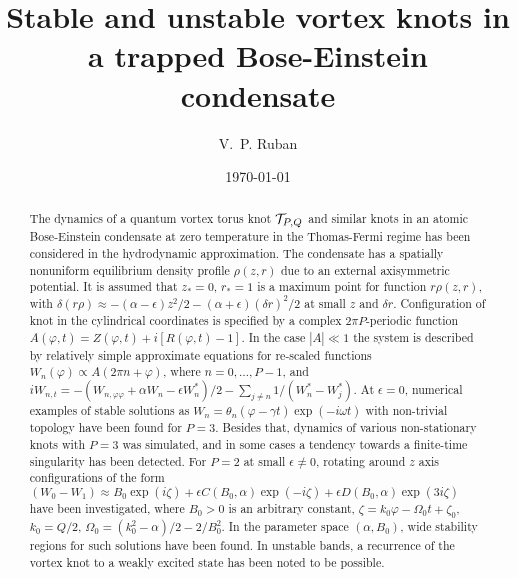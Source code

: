 \documentclass[pra,twocolumn,showpacs]{revtex4}
\begin{document}
\title{ Stable and unstable vortex knots in a trapped Bose-Einstein condensate }
\author{V.~P. Ruban}
\date{\today}

\begin{abstract}
The dynamics of a quantum vortex torus knot ${\cal T}_{P,Q}$ and similar knots in an atomic
Bose-Einstein condensate at zero temperature in the Thomas-Fermi regime has been considered 
in the hydrodynamic approximation. The condensate has a spatially nonuniform equilibrium 
density profile $\rho(z,r)$ due to an external axisymmetric potential. It is assumed that 
$z_*=0$, $r_*=1$ is a maximum point for function $r\rho(z,r)$, with 
$\delta (r\rho)\approx-(\alpha-\epsilon) z^2/2 -(\alpha+\epsilon) (\delta r)^2/2$ at small 
$z$ and $\delta r$. Configuration of knot in the cylindrical coordinates is specified by 
a complex $2\pi P$-periodic function $A(\varphi,t)=Z(\varphi,t)+i [R(\varphi,t)-1]$. 
In the case  $|A|\ll 1$ the system is described by relatively simple approximate equations
for re-scaled functions $W_n(\varphi)\propto A(2\pi n+\varphi)$, where $n=0,\dots,P-1$, and
$iW_{n,t}=-(W_{n,\varphi\varphi}+\alpha W_n -\epsilon W_n^*)/2-\sum_{j\neq n}1/(W_n^*-W_j^*)$.
At $\epsilon=0$, numerical examples of stable solutions as 
$W_n=\theta_n(\varphi-\gamma t)\exp(-i\omega t)$ with non-trivial topology have been found for $P=3$.
Besides that, dynamics of various non-stationary knots with $P=3$ was simulated, and in some
cases a tendency towards a finite-time singularity has been detected. For $P=2$ at small 
$\epsilon\neq 0$, rotating around $z$ axis configurations of the form
$(W_0-W_1)\approx B_0\exp(i\zeta)+\epsilon C(B_0,\alpha)\exp(-i\zeta) + \epsilon D(B_0,\alpha)\exp(3i\zeta)$
have been investigated, where $B_0>0$ is an arbitrary constant, $\zeta=k_0\varphi -\Omega_0 t+\zeta_0$, 
$k_0=Q/2$, $\Omega_0=(k_0^2-\alpha)/2-2/B_0^2$. In the parameter space $(\alpha, B_0)$,
wide stability regions for such solutions have been found. In unstable bands,
a recurrence of the vortex knot to a weakly excited state has been noted to be possible.
\end{abstract}
\maketitle
\end{document}
